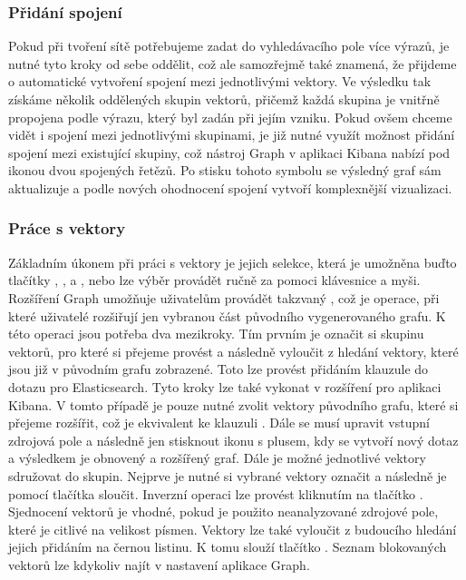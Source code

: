 \documentclass[czech,BP]{thesiskiv}
\begin{document}
\subsubsection{Přidání spojení}
Pokud při tvoření sítě potřebujeme zadat do vyhledávacího pole více výrazů, je nutné tyto kroky od sebe oddělit, což ale samozřejmě také znamená, že přijdeme o automatické vytvoření spojení mezi jednotlivými vektory. Ve výsledku tak získáme několik oddělených skupin vektorů, přičemž každá skupina je vnitřně propojena podle výrazu, který byl zadán při jejím vzniku. Pokud ovšem chceme vidět i spojení mezi jednotlivými skupinami, je již nutné využít možnost přidání spojení mezi existující skupiny, což nástroj Graph v aplikaci Kibana nabízí pod ikonou dvou spojených řetězů. Po stisku tohoto symbolu se výsledný graf sám aktualizuje a podle nových ohodnocení spojení vytvoří komplexnější vizualizaci.
\subsubsection{Práce s vektory}
Základním úkonem při práci s vektory je jejich selekce, která je umožněna buďto tlačítky , ,  a , nebo lze výběr provádět ručně za pomoci klávesnice  a myši.
\\
Rozšíření Graph umožňuje uživatelům provádět takzvaný , což je operace, při které uživatelé rozšiřují jen vybranou část původního vygenerovaného grafu. K této operaci jsou potřeba dva mezikroky. Tím prvním je označit si skupinu vektorů, pro které si přejeme provést  a následně vyloučit z hledání vektory, které jsou již v původním grafu zobrazené. Toto lze provést přidáním klauzule  do dotazu pro Elasticsearch.\cite{Spidering} Tyto kroky lze také vykonat v rozšíření pro aplikaci Kibana. V tomto případě je pouze nutné zvolit vektory původního grafu, které si přejeme rozšířit, což je ekvivalent ke klauzuli . Dále se musí upravit vstupní zdrojová pole a následně jen stisknout ikonu s plusem, kdy se vytvoří nový dotaz a výsledkem je obnovený a rozšířený graf. Dále je možné jednotlivé vektory sdružovat do skupin. Nejprve je nutné si vybrané vektory označit a následně je pomocí tlačítka  sloučit. Inverzní operaci lze provést kliknutím na tlačítko . Sjednocení vektorů je vhodné, pokud je použito neanalyzované zdrojové pole, které je citlivé na velikost písmen. Vektory lze také vyloučit z budoucího hledání jejich přidáním na černou listinu. K tomu slouží tlačítko . Seznam blokovaných vektorů lze kdykoliv najít v nastavení aplikace Graph.
\end{document}
